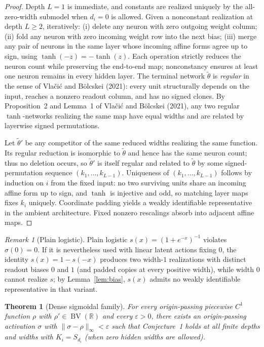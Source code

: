 \documentclass[11pt]{article}
\theoremstyle{plain}
\newtheorem{theorem}{Theorem}
\theoremstyle{definition}
\theoremstyle{remark}
\newtheorem{remark}{Remark}
\DeclareMathOperator{\BV}{BV}
\begin{document}
\begin{proof}
Depth $L = 1$ is immediate, and constants are realized uniquely by the all-zero-width submodel when $d_i = 0$ is allowed. Given a nonconstant realization at depth $L \ge 2$, iteratively: (i) delete any neuron with zero outgoing weight column; (ii) fold any neuron with zero incoming weight row into the next bias; (iii) merge any pair of neurons in the same layer whose incoming affine forms agree up to sign, using $\tanh(-z) = -\tanh(z)$. Each operation strictly reduces the neuron count while preserving the end-to-end map; nonconstancy ensures at least one neuron remains in every hidden layer. The terminal network $\tilde{\theta}$ is \emph{regular} in the sense of Vla\v{c}i\'c and B\"olcskei (2021): every unit structurally depends on the input, reaches a nonzero readout column, and has no signed clones. By Proposition~2 and Lemma~1 of Vla\v{c}i\'c and B\"olcskei (2021), any two regular $\tanh$-networks realizing the same map have equal widths and are related by layerwise signed permutations.

Let $\tilde{\theta}'$ be any competitor of the same reduced widths realizing the same function. Its regular reduction is isomorphic to $\tilde{\theta}$ and hence has the same neuron count; thus no deletion occurs, so $\tilde{\theta}'$ is itself regular and related to $\tilde{\theta}$ by some signed-permutation sequence $(k_1, \dots, k_{L-1})$. Uniqueness of $(k_1, \dots, k_{L-1})$ follows by induction on $i$ from the fixed input: no two surviving units share an incoming affine form up to sign, and $\tanh$ is injective and odd, so matching layer maps fixes $k_i$ uniquely. Coordinate padding yields a weakly identifiable representative in the ambient architecture. Fixed nonzero rescalings absorb into adjacent affine maps.
\end{proof}

\begin{remark}[Plain logistic]
Plain logistic $s(x) = (1 + e^{-x})^{-1}$ violates $\sigma(0) = 0$. If it is nevertheless used with linear latent actions fixing $0$, the identity $s(x) = 1 - s(-x)$ produces two width-$1$ realizations with distinct readout biases $0$ and $1$ (and padded copies at every positive width), while width $0$ cannot realize $s$; by Lemma~\ref{lem:bias}, $s(x)$ admits no weakly identifiable representative in that variant.
\end{remark}

\begin{theorem}[Dense sigmoidal family]\label{thm:sigmoidal}
For every origin-passing piecewise $C^1$ function $\rho$ with $\rho' \in \BV(\mathbb{R})$ and every $\varepsilon > 0$, there exists an origin-passing activation $\sigma$ with $\|\sigma - \rho\|_\infty < \varepsilon$ such that Conjecture~1 holds at all finite depths and widths with $K_i = S_{d_i}$ (when zero hidden widths are allowed).
\end{theorem}
\end{document}
